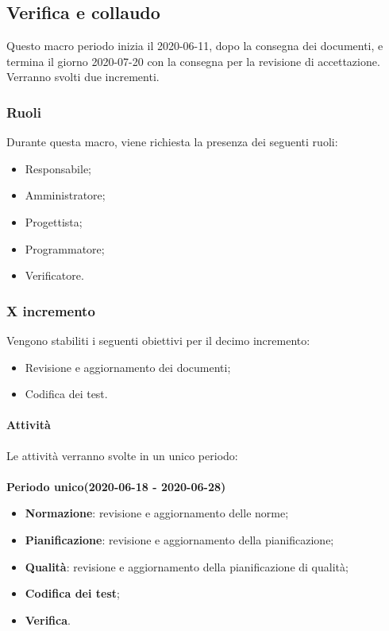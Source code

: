 \documentclass[../piano-di-progetto.tex]{subfiles}
\begin{document}
\subsection{Verifica e collaudo}
Questo macro periodo inizia il 2020-06-11, dopo la consegna dei documenti, e termina il giorno 2020-07-20 con la consegna per la revisione di accettazione. Verranno svolti due incrementi.

\subsubsection{Ruoli}
Durante questa macro, viene richiesta la presenza dei seguenti ruoli:
\begin{itemize}
    \item Responsabile;
    \item Amministratore;
    \item Progettista;
    \item Programmatore;
    \item Verificatore.
\end{itemize}

\subsubsection{X incremento}
 Vengono stabiliti i seguenti obiettivi per il decimo incremento:
 \begin{itemize}
     \item Revisione e aggiornamento dei documenti;
     \item Codifica dei test.
 \end{itemize}

\paragraph{Attività}
Le attività verranno svolte in un unico periodo:
\\
\\
\textbf{Periodo unico(2020-06-18 - 2020-06-28)}
\begin{itemize}
        \item \textbf{Normazione}: revisione e aggiornamento delle norme;
        \item \textbf{Pianificazione}: revisione e aggiornamento della pianificazione;
        \item \textbf{Qualità}: revisione e aggiornamento della pianificazione di qualità;
        \item \textbf{Codifica dei test};
        \item \textbf{Verifica}.
\end{itemize}
\end{document}
